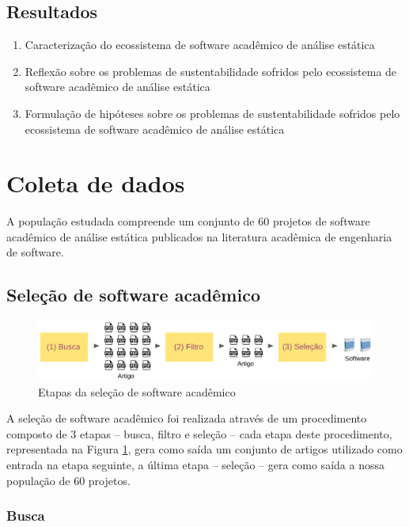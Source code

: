 \subsection{Resultados}

\begin{enumerate}
  \item Caracterização do ecossistema de software acadêmico de análise estática
  \item Reflexão sobre os problemas de sustentabilidade sofridos pelo ecossistema de software acadêmico de análise estática
  \item Formulação de hipóteses sobre os problemas de sustentabilidade sofridos pelo ecossistema de software acadêmico de análise estática
\end{enumerate}

\section{Coleta de dados}

A população estudada compreende um conjunto de 60 projetos de software
acadêmico de análise estática publicados na literatura acadêmica de engenharia
de software.

\subsection{Seleção de software acadêmico}

\begin{figure}[h]
  \center
  \includegraphics[scale=0.21]{imagens/revisao-estruturada.png}
  \caption{Etapas da seleção de software acadêmico}
  \label{figura-revisao-estruturada}
\end{figure}

A seleção de software acadêmico foi realizada através de um procedimento
composto de 3 etapas -- busca, filtro e seleção -- cada etapa deste
procedimento, representada na Figura \ref{figura-revisao-estruturada}, gera
como saída um conjunto de artigos utilizado como entrada na etapa seguinte, a
última etapa -- seleção -- gera como saída a nossa população de 60 projetos.

\subsubsection{Busca}

